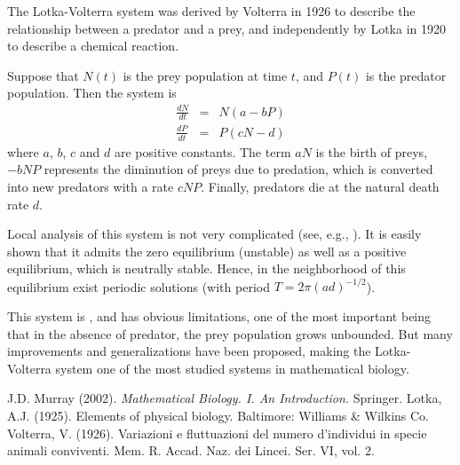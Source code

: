 \documentclass[12pt]{article}
\begin{document}
The Lotka-Volterra system was derived by Volterra in 1926 to describe the relationship between a predator and a prey, and independently by Lotka in 1920 to describe a chemical reaction.

Suppose that $N(t)$ is the prey population at time $t$, and $P(t)$ is the predator population. Then the system is
\begin{eqnarray*}
\frac{dN}{dt}&=& N(a-bP) \\
\frac{dP}{dt}&=& P(cN-d)
\end{eqnarray*}
where $a$, $b$, $c$ and $d$ are positive constants. The term $aN$ is the birth of preys, $-bNP$ represents the diminution of preys due to predation, which is converted into new predators with a rate $cNP$. Finally, predators die at the natural death rate $d$.

Local analysis of this system is not very complicated (see, e.g., \cite{Murray}). It is easily shown that it admits the zero equilibrium (unstable) as well as a positive equilibrium, which is neutrally stable. Hence, in the neighborhood of this equilibrium exist periodic solutions (with period $T=2\pi(ad)^{-1/2}$).

This system is , and has obvious limitations, one of the most important being that in the absence of predator, the prey population grows unbounded. But many improvements and generalizations have been proposed, making the Lotka-Volterra system one of the most studied systems in mathematical biology.

\begin{thebibliography}{1}
J.D. Murray (2002). {\em Mathematical Biology. I. An Introduction.} Springer.
Lotka, A.J. (1925). Elements of physical biology. Baltimore: Williams \& Wilkins Co.
Volterra, V. (1926). Variazioni e fluttuazioni del numero d'individui in specie animali conviventi. Mem. R. Accad. Naz. dei Lincei. Ser. VI, vol. 2.
\end{thebibliography}
\end{document}

